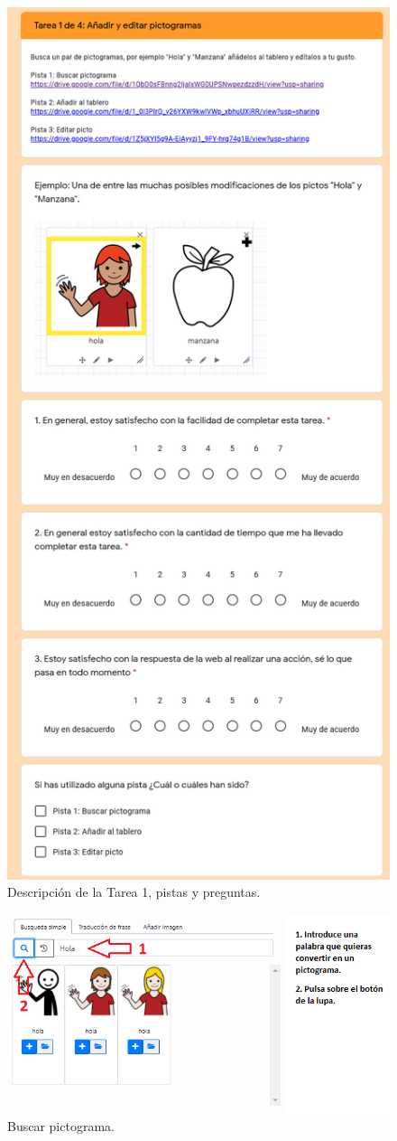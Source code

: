\begin{figure}[h!]
	\centering
	\includegraphics[width=0.78\linewidth]{Imagenes/Bitmap/Tarea1Preguntas}
	\caption{Descripción de la Tarea 1, pistas y preguntas.}
	\label{fig:tarea1preguntas}
\end{figure}


\begin{figure}[h!]
	\centering
	\includegraphics[width=0.7\linewidth]{Imagenes/Bitmap/Tarea1-Pista1}
	\caption{Buscar pictograma.}
	\label{fig:tarea1-pista1}
\end{figure}

